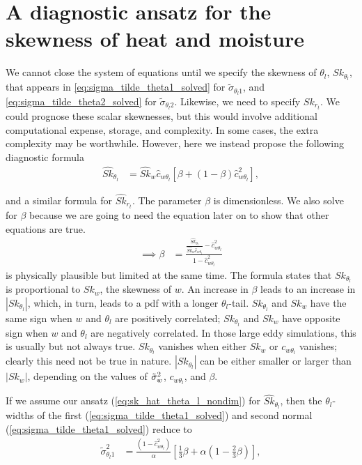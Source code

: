 \section{A diagnostic ansatz for the skewness of heat and moisture}\label{sec:diag_ansatz}

We cannot close the system of equations until we specify the skewness of $\theta_l$, $Sk_{\theta_l}$, that appears in \cref{eq:sigma_tilde_theta1_solved} for $\tilde{\sigma}_{\theta_l 1}$, and \cref{eq:sigma_tilde_theta2_solved} for $\tilde{\sigma}_{\theta_l 2}$.
Likewise, we need to specify $Sk_{r_t}$.
We could prognose these scalar skewnesses, but this would involve additional computational expense, storage, and complexity.
In some cases, the extra complexity may be worthwhile.
However, here we instead propose the following diagnostic formula
\begin{align}
    \label{eq:Sk_hat_thl_beta}
    \widehat{Sk}_{\theta_l}
    &= \widehat{Sk}_w \widehat{c}_{w \theta_l} \left[\beta + (1-\beta) \widehat{c}_{w \theta_l}^2 \right],
\end{align}

and a similar formula for $\widehat{Sk}_{r_t}$.
The parameter $\beta$ is dimensionless.
We also solve for $\beta$ because we are going to need the equation later on to show that other equations are true.
\begin{align}
    \label{eq:beta}
    \implies \beta
    &=\frac{\frac{\widehat{Sk}_{\theta_l}}{\widehat{Sk}_w \widehat{c}_{w \theta_l}} - \widehat{c}_{w \theta_l}^2}{1 - \widehat{c}_{w \theta_l}^2}
\end{align}
 is physically plausible but limited at the same time.
The formula states that $Sk_{\theta_l}$ is proportional to $Sk_w$, the skewness of $w$.
An increase in $\beta$ leads to an increase in $\left| Sk_{\theta_l} \right|$, which, in turn, leads to a \gls{pdf} with a longer $\theta_l$-tail.
$Sk_{\theta_l}$ and $Sk_w$ have the same sign when $w$ and $\theta_l$ are positively correlated;
$Sk_{\theta_l}$ and $Sk_w$ have opposite sign when $w$ and $\theta_l$ are negatively correlated.
In those large eddy simulations, this is usually but not always true.
$Sk_{\theta_l}$ vanishes when either $Sk_w$ or $c_{w \theta_l}$ vanishes;
clearly this need not be true in nature.
$\left| Sk_{\theta_l} \right|$ can be either smaller or larger than $\left| Sk_w \right|$, depending on the values of ${\tilde{\sigma}_w}^2$, $c_{w \theta_l}$, and $\beta$.

If we assume our ansatz (\cref{eq:sk_hat_theta_l_nondim}) for $\widehat{Sk}_{\theta_l}$, then the $\theta_l$-widths of the first (\cref{eq:sigma_tilde_theta1_solved})
and second normal (\cref{eq:sigma_tilde_theta1_solved}) reduce to
\begin{align}
    \label{eq:sigma_theta1_beta}
    \tilde{\sigma}_{\theta_l 1}^2
    &= \frac{\left(1 - \widehat{c}_{w \theta_l}^2\right)}{\alpha} \left[\frac{1}{3} \beta + \alpha \left(1 - \frac{2}{3} \beta\right)\right],
\end{align}

